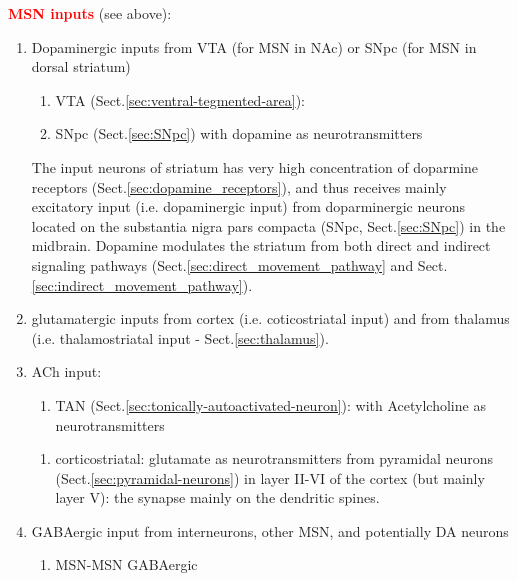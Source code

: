 \textcolor{red}{\bf MSN inputs} (see above):
\begin{enumerate}
  
  \item Dopaminergic inputs from VTA (for MSN in NAc) or SNpc (for MSN in
  dorsal striatum)

\begin{enumerate}
   \item VTA (Sect.\ref{sec:ventral-tegmented-area}):
  
   \item SNpc (Sect.\ref{sec:SNpc})  with dopamine as neurotransmitters
\end{enumerate}
The input neurons of striatum  has very high concentration of doparmine
receptors (Sect.\ref{sec:dopamine_receptors}), and thus
receives mainly excitatory input (i.e. dopaminergic input) from doparminergic
neurons located on the substantia nigra pars compacta (SNpc,
Sect.\ref{sec:SNpc}) in the midbrain.
Dopamine modulates the striatum from both direct and indirect signaling
pathways (Sect.\ref{sec:direct_movement_pathway} and
Sect.\ref{sec:indirect_movement_pathway}).

  \item glutamatergic inputs from cortex (i.e. coticostriatal input) and 
from thalamus (i.e. thalamostriatal input - Sect.\ref{sec:thalamus}). 
  
  \item ACh input:
\begin{enumerate}
    \item TAN (Sect.\ref{sec:tonically-autoactivated-neuron}): with Acetylcholine
  as neurotransmitters
\end{enumerate}

\begin{enumerate}

  \item corticostriatal:  glutamate as neurotransmitters from pyramidal neurons
  (Sect.\ref{sec:pyramidal-neurons}) in layer II-VI of the cortex (but mainly
  layer V): the synapse mainly on the dendritic spines.  
\end{enumerate}

  \item GABAergic input from interneurons, other MSN, and potentially DA neurons

\begin{enumerate}
  
  \item MSN-MSN GABAergic 


\end{enumerate}
\end{enumerate}
